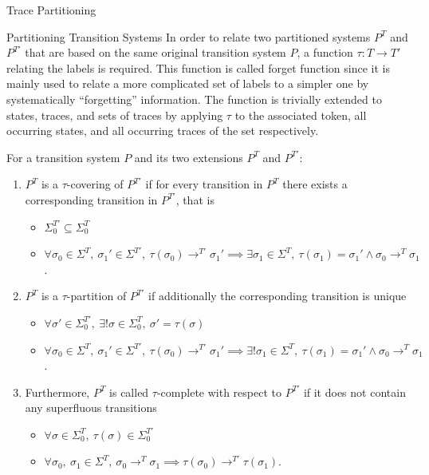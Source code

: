 \begin{chapter}{Trace Partitioning}
\begin{section}{Partitioning Transition Systems}
		In order to relate two partitioned systems $P^T$ and $P^{T'}$ that are based on the same original transition system $P$, a function $\tau: T \to T'$ relating the labels is required. This function is called forget function since it is mainly used to relate a more complicated set of labels to a simpler one by systematically ``forgetting'' information. The function is trivially extended to states, traces, and sets of traces by applying $\tau$ to the associated token, all occurring states, and all occurring traces of the set respectively.

		\begin{definition}
			For a transition system $P$ and its two extensions $P^T$ and $P^{T'}$:
			\begin{enumerate}
				\item $P^T$ is a $\tau$-covering of $P^{T'}$ if for every transition in $P^{T}$ there exists a corresponding transition in $P^{T'}$, that is
					\begin{itemize}
						\item $\Sigma_0^{T'} \subseteq \Sigma_0^T$
						\item $\forall \sigma_0 \in \Sigma^T, \ \sigma_1' \in \Sigma^{T'}, \ \tau(\sigma_0) \to^{T'} \sigma_1' \implies \exists \sigma_1 \in \Sigma^T, \ \tau(\sigma_1) = \sigma_1' \land \sigma_0 \to^T \sigma_1$.
					\end{itemize}
				\item $P^T$ is a $\tau$-partition of $P^{T'}$ if additionally the corresponding transition is unique
					\begin{itemize}
						\item $\forall \sigma' \in \Sigma_0^{T'}, \ \exists! \sigma \in \Sigma_0^T, \ \sigma' = \tau(\sigma)$
						\item $\forall \sigma_0 \in \Sigma^T, \ \sigma_1' \in \Sigma^{T'}, \ \tau(\sigma_0) \to^{T'} \sigma_1' \implies \exists! \sigma_1 \in \Sigma^T, \ \tau(\sigma_1) = \sigma_1' \land \sigma_0 \to^T \sigma_1$.
					\end{itemize}
				\item Furthermore, $P^T$ is called $\tau$-complete with respect to $P^{T'}$ if it does not contain any superfluous transitions
					\begin{itemize}
						\item $\forall \sigma \in \Sigma_0^T, \ \tau(\sigma) \in \Sigma_0^{T'}$
						\item $\forall \sigma_0, \ \sigma_1 \in \Sigma^{T}, \ \sigma_0 \to^T \sigma_1 \implies \tau(\sigma_0) \to^{T'} \tau(\sigma_1)$.
					\end{itemize}
			\end{enumerate}
		\end{definition}


\end{section}
\end{chapter}
